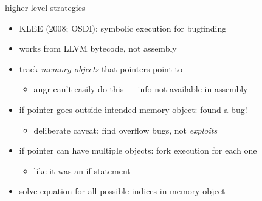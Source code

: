 \begin{frame}{higher-level strategies}
    \begin{itemize}
    \item KLEE (2008; OSDI): symbolic execution for bugfinding
    \item works from LLVM bytecode, not assembly
    \vspace{.5cm}
    \item track \textit{memory objects} that pointers point to
        \begin{itemize}
        \item angr can't easily do this --- info not available in assembly
        \end{itemize}
    \item if pointer goes outside intended memory object: found a bug!
        \begin{itemize}
        \item deliberate caveat: find overflow bugs, not \textit{exploits}
        \end{itemize}
    \item if pointer can have multiple objects: fork execution for each one
        \begin{itemize}
        \item like it was an if statement
        \end{itemize}
    \item solve equation for all possible indices in memory object
    \end{itemize}
\end{frame}
